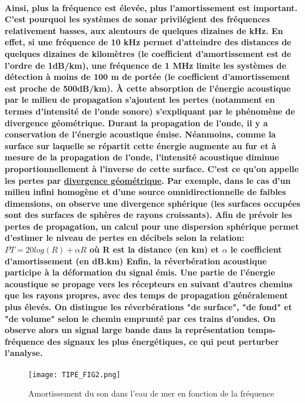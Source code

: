 \documentclass[a4paper,11pt]{article}
\begin{document}
\paragraph{\normalfont Ainsi, \textbf{plus la fr\'{e}quence est \'{e}lev\'{e}e, plus l'amortissement est important}. C'est pourquoi les syst\`{e}mes de sonar privil\'{e}gient des \textbf{fr\'{e}quences relativement basses}, aux alentours de quelques dizaines de kHz. En effet, si une fr\'{e}quence de 10 kHz permet d'atteindre des distances de quelques dizaines de kilom\`{e}tres (le coefficient d'amortissement est de l'ordre de 1dB/km), une fr\'{e}quence de 1 MHz limite les syst\`{e}mes de d\'{e}tection \`{a} moins de 100 m de port\'{e}e (le coefficient d'amortissement est proche de 500dB/km). \newline \newline \`{A} cette absorption de l'\'{e}nergie acoustique par le milieu de propagation s'ajoutent les \textbf{pertes} (notamment en termes d'intensit\'{e} de l'onde sonore) s'expliquant par le ph\'{e}nom\`{e}ne de divergence g\'{e}om\'{e}trique. Durant la propagation de l'onde, il y a \textbf{conservation de l'\'{e}nergie acoustique \'{e}mise}. N\'{e}anmoins, comme la surface sur laquelle se r\'{e}partit cette \'{e}nergie augmente au fur et \`{a} mesure de la propagation de l'onde, \textbf{l'intensit\'{e} acoustique diminue proportionnellement \`{a} l'inverse de cette surface}. C'est ce qu'on appelle les pertes par \textbf{\underline{divergence g\'{e}om\'{e}trique}}. Par exemple, dans le cas d'un milieu infini homog\`{e}ne et d'une source omnidirectionnelle de faibles dimensions, on observe une \textbf{divergence sph\'{e}rique} (les surfaces occup\'{e}es sont des surfaces de sph\`{e}res de rayons croissants). \newline \newline
Afin de pr\'{e}voir les pertes de propagation, un calcul pour une dispersion sph\'{e}rique permet d'estimer le niveau de pertes en d\'{e}cibels selon la relation: $PT = 20 log(R) + \alpha R$ o\`{u} R est la distance (en km) et $ \alpha $ le coefficient d'amortissement (en dB.km) \newline \newline
Enfin, la \textbf{r\'{e}verb\'{e}ration acoustique} participe \`{a} la \textbf{d\'{e}formation du signal \'{e}mis}. Une partie de l'\'{e}nergie acoustique se propage vers les r\'{e}cepteurs en suivant d'autres chemins que les rayons propres, avec des temps de propagation g\'{e}n\'{e}ralement plus \'{e}lev\'{e}s. On distingue les r\'{e}verb\'{e}rations "de surface", "de fond" et "de volume" selon le chemin emprunt\'{e} par ces trains d'ondes.  On observe alors un signal large bande dans la repr\'{e}sentation temps-fr\'{e}quence des signaux les plus \'{e}nerg\'{e}tiques, ce qui peut perturber l'analyse.}
\begin{figure}[!h]
\texttt{[image: TIPE\_FIG2.png]}
\caption{Amortissement du son dans l'eau de mer en fonction de la fr\'{e}quence}
\label{fig_2}
\end{figure}
\end{document}
